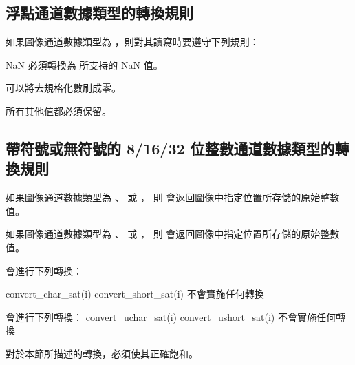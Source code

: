 \subsection{浮點通道數據類型的轉換規則}

如果圖像通道數據類型為 ，則對其讀寫時要遵守下列規則：
\startigBase
\item NaN 必須轉換為  所支持的 NaN 值。
\item 可以將去規格化數刷成零。
\item 所有其他值都必須保留。
\stopigBase

\subsection{帶符號或無符號的 8/16/32 位整數通道數據類型的轉換規則}

如果圖像通道數據類型為 、 
或 ，
則  會返回圖像中指定位置所存儲的原始整數值。

如果圖像通道數據類型為 、 
或 ，
則  會返回圖像中指定位置所存儲的原始整數值。

 會進行下列轉換：

convert_char_sat(i)
\stopclCmmDesc
{}
convert_short_sat(i)
\stopclCmmDesc
{}
不會實施任何轉換
\stopclCmmDesc

 會進行下列轉換：
convert_uchar_sat(i)
\stopclCmmDesc
{}
convert_ushort_sat(i)
\stopclCmmDesc
{}
不會實施任何轉換
\stopclCmmDesc

對於本節所描述的轉換，必須使其正確飽和。
